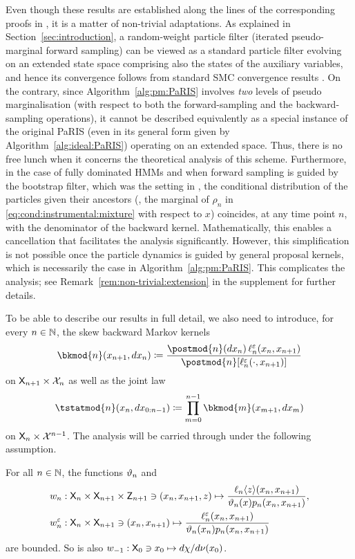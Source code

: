 Even though these results are established along the lines of the corresponding proofs in \cite{olsson:westerborn:2014b}, it is a matter of non-trivial adaptations. As explained in Section~\ref{sec:introduction}, a random-weight particle filter (iterated pseudo-marginal forward sampling) can be viewed as a standard particle filter evolving on an extended state space comprising also the states of the auxiliary variables, and hence its convergence follows from standard SMC convergence results \cite{fearnhead2008particle}. On the contrary, since Algorithm~\ref{alg:pm:PaRIS} involves \emph{two} levels of pseudo marginalisation (with respect to both the forward-sampling and the backward-sampling operations), it cannot be described equivalently as a special instance of the original PaRIS (even in its general form given by Algorithm~\ref{alg:ideal:PaRIS}) operating on an extended space. Thus, there is no free lunch when it concerns the theoretical analysis of this scheme. Furthermore, in the case of fully dominated HMMs and when forward sampling is guided by the bootstrap filter, which was the setting in \cite{olsson:westerborn:2014b}, the conditional distribution of the particles given their ancestors (\ie, the marginal of $\rho_n$ in \eqref{eq:cond:instrumental:mixture} with respect to $x$) coincides, at any time point $n$, with the denominator of the backward kernel. Mathematically, this enables a cancellation that facilitates the analysis significantly. However, this simplification is not possible once the particle dynamics is guided by general proposal kernels, which is necessarily the case in Algorithm~\ref{alg:pm:PaRIS}. This complicates the analysis; see Remark~\ref{rem:non-trivial:extension} in the supplement for further details.

To be able to describe our results in full detail, we also need to introduce, for every $n \in \mathbb{N}$, the skew backward Markov kernels 
$$
    \bkmod{n}(x_{n + 1}, \rmd x_n) \eqdef \frac{\postmod{n}(\rmd x_n) \, \udmod{n}(x_n, x_{n + 1})}{\postmod{n}[\udmod{n}(\cdot, x_{n + 1})]}
$$
on $\mathsf{X}_{n + 1} \times \mathcal{X}_n$ as well as the joint law 
\begin{equation} \label{eq:skew:backward:law}
\tstatmod{n}(x_n, \rmd x_{0:n - 1}) \eqdef \prod_{m = 0}^{n - 1} \bkmod{m}(x_{m + 1}, \rmd x_m)
\end{equation}
on $\mathsf{X}_n \times \mathcal{X}^{n - 1}$. The analysis will be carried through under the following assumption.
\begin{hypH}
\label{assum:bound:filter:pseudomarginal}
For all $n \in \mathbb{N}$, the functions $\vartheta_{n}$ and  
\begin{align*}
&\wgtfuncext{n} : \Xset_n \times \Xset_{n + 1} \times \Zset_{n + 1} \ni (x_n, x_{n + 1}, z) \mapsto \frac{\ukest{n}{z}(x_n, x_{n + 1})}{\adjfuncforward{n}(x) \kissforward{n}{n}(x_n, x_{n + 1})}, \\
&\wgtfuncmod{n} : \Xset_n \times \Xset_{n + 1} \ni (x_n, x_{n + 1}) \mapsto \frac{\udmod{n}(x_n, x_{n + 1})}{\adjfuncforward{n}(x_n) \kissforward{n}{n}(x_n, x_{n + 1})}
\end{align*}
are bounded. So is also $w_{-1} : \mathsf{X}_0 \ni x_0 \mapsto d \chi / d \nu(x_0)$. 
\end{hypH}


